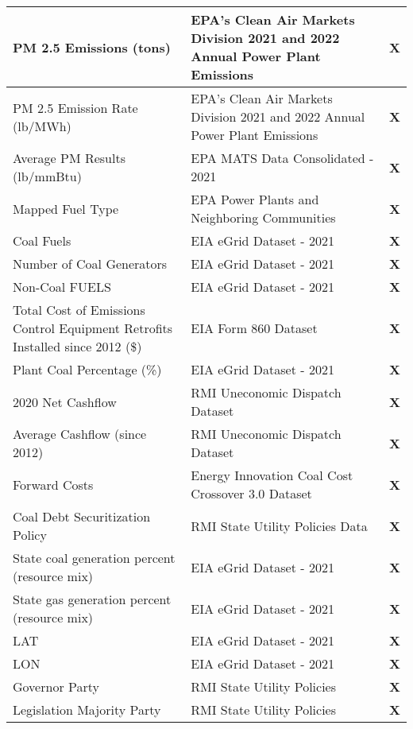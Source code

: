 \begin{table}[H]
\begin{adjustbox}{width=\textwidth}
\begin{tabular}{|l | l | l |}
        PM 2.5 Emissions (tons) & EPA's Clean Air Markets Division 2021 and 2022 Annual Power Plant Emissions & \textbf{X} \\
        \midrule
        PM 2.5 Emission Rate (lb/MWh) & EPA's Clean Air Markets Division 2021 and 2022 Annual Power Plant Emissions & \textbf{X} \\
        \midrule
        Average PM Results (lb/mmBtu) & EPA MATS Data Consolidated - 2021 & \textbf{X} \\
        \midrule
        Mapped Fuel Type & EPA Power Plants and Neighboring Communities & \textbf{X} \\
        \midrule
        Coal Fuels & EIA eGrid Dataset - 2021 & \textbf{X} \\
        \midrule
        Number of Coal Generators & EIA eGrid Dataset - 2021 & \textbf{X} \\
        \midrule
        Non-Coal FUELS & EIA eGrid Dataset - 2021 & \textbf{X} \\
        \midrule
        Total Cost of Emissions Control Equipment Retrofits Installed since 2012 (\$) & EIA Form 860 Dataset & \textbf{X} \\
        \midrule
        Plant Coal Percentage (\%) & EIA eGrid Dataset - 2021 & \textbf{X} \\
        \midrule
        2020 Net Cashflow & RMI Uneconomic Dispatch Dataset & \textbf{X} \\
        \midrule
        Average Cashflow (since 2012) & RMI Uneconomic Dispatch Dataset & \textbf{X} \\
        \midrule
        Forward Costs & Energy Innovation Coal Cost Crossover 3.0 Dataset & \textbf{X} \\
        \midrule
        Coal Debt Securitization Policy & RMI State Utility Policies Data & \textbf{X} \\
        \midrule
        State coal generation percent (resource mix) & EIA eGrid Dataset - 2021 & \textbf{X} \\
        \midrule
        State gas generation percent (resource mix) & EIA eGrid Dataset - 2021 & \textbf{X} \\
        \midrule
        LAT & EIA eGrid Dataset - 2021 & \textbf{X} \\
        \midrule
        LON & EIA eGrid Dataset - 2021 & \textbf{X} \\
        \midrule
        Governor Party & RMI State Utility Policies & \textbf{X} \\
        \midrule
        Legislation Majority Party & RMI State Utility Policies & \textbf{X} \\

\end{tabular}
\end{adjustbox}
\end{table}
